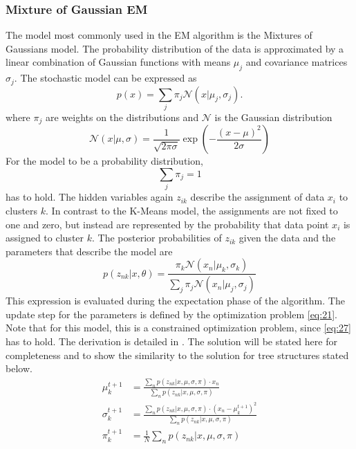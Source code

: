 \subsubsection{Mixture of Gaussian EM}
\label{sec:mixture-gaussian-em}
The model most commonly used in the EM algorithm is the Mixtures of Gaussians model.
The probability distribution of the data is approximated by a linear combination of Gaussian functions with means $\mu_j$ and covariance matrices $\sigma_j$.
The stochastic model can be expressed as
\begin{equation}
  \label{eq:22}
  p(x) = \sum_{j}\pi_j\mathcal{N}(x|\mu_j,\sigma_j).
\end{equation}
where $\pi_j$ are weights on the distributions and $\mathcal{N}$ is the Gaussian distribution
\begin{equation}
  \label{eq:25}
  \mathcal{N}(x|\mu,\sigma) = \frac{1}{\sqrt{2\pi\sigma}}\exp\left(-\frac{(x-\mu)^2}{2\sigma}\right)
\end{equation}
For the model to be a probability distribution,
\begin{equation}
  \label{eq:27}
  \sum_j\pi_j = 1
\end{equation}
has to hold.
The hidden variables again $z_{ik}$ describe the  assignment of data $x_i$ to clusters $k$.
In contrast to the K-Means model, the assignments are not fixed to one and zero, but instead are represented by the probability that data point $x_i$ is assigned to cluster $k$.
The posterior probabilities of $z_{ik}$ given the data and the parameters that describe the model are
\begin{equation}
  \label{eq:26}
  p(z_{nk}|x, \theta) = \frac{\pi_k\mathcal{N}(x_n|\mu_k,\sigma_k)}{\sum_j\pi_j\mathcal{N}(x_n|\mu_j, \sigma_j)}
\end{equation}
This expression is evaluated during the expectation phase of the algorithm.
The update step for the parameters is defined by the optimization problem \eqref{eq:21}.
Note that for this model, this is a constrained optimization problem, since \eqref{eq:27} has to hold.
The derivation is detailed in .
The solution will be stated here for completeness and to show the similarity to the solution for tree structures stated below.
\begin{align}
  \label{eq:29}
  \mu_k^{t+1} &= \frac{\sum_np(z_{nk}|x, \mu, \sigma, \pi)\cdot x_n}{\sum_np(z_{nk}|x, \mu, \sigma, \pi)}\\
  \sigma_k^{t+1}&= \frac{\sum_np(z_{nk}|x, \mu, \sigma, \pi)\cdot (x_n-\mu_k^{t+1})^2}{\sum_np(z_{nk}|x, \mu, \sigma, \pi)}\\
  \pi_k^{t+1}&= \frac{1}{N}\sum_{n}p(z_{nk}|x, \mu, \sigma, \pi)
\end{align}


